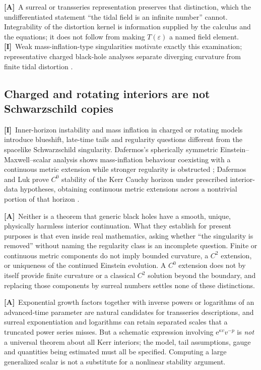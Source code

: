 \documentclass[11pt,letterpaper]{article}
\numberwithin{equation}{section}
\theoremstyle{definition}
\theoremstyle{remark}
\newcommand{\eps}{\varepsilon}
\newcommand{\ee}{\mathrm e}
\newcommand{\TA}{\textcolor{TierA}{\textsf{\bfseries[A]}}}
\newcommand{\TI}{\textcolor{TierI}{\textsf{\bfseries[I]}}}
\begin{document}
\TA\ A surreal or transseries representation preserves that distinction, which
the undifferentiated statement ``the tidal field is an infinite number''
cannot. Integrability of the distortion kernel is information supplied by the
calculus and the equations; it does not follow from making $T(\eps)$ a named
field element. \TI\ Weak mass-inflation-type singularities motivate exactly
this examination; representative charged black-hole analyses separate
diverging curvature from finite tidal distortion
\cite{phys:Bhattacharjee}.

\subsection{Charged and rotating interiors are not Schwarzschild copies}
\label{phys:sub:kerr}

\TI\ Inner-horizon instability and mass inflation in charged or rotating
models introduce blueshift, late-time tails and regularity questions different
from the spacelike Schwarzschild singularity. Dafermos's spherically symmetric
Einstein--Maxwell--scalar analysis shows mass-inflation behaviour coexisting
with a continuous metric extension while stronger regularity is obstructed
\cite{phys:Dafermos}; Dafermos and Luk prove $C^{0}$ stability of the Kerr
Cauchy horizon under prescribed interior-data hypotheses, obtaining continuous
metric extensions across a nontrivial portion of that horizon
\cite{phys:DafermosLuk}.

\TA\ Neither is a theorem that generic black holes have a smooth, unique,
physically harmless interior continuation. What they establish for present
purposes is that even inside real mathematics, asking whether ``the singularity
is removed'' without naming the regularity class is an incomplete question.
Finite or continuous metric components do not imply bounded curvature, a
$C^{2}$ extension, or uniqueness of the continued Einstein evolution. A $C^{0}$
extension does not by itself provide finite curvature or a classical $C^{2}$
solution beyond the boundary, and replacing those components by surreal numbers
settles none of these distinctions.

\TA\ Exponential growth factors together with inverse powers or logarithms of
an advanced-time parameter are natural candidates for transseries descriptions,
and surreal exponentiation and logarithms can retain separated scales that a
truncated power series misses. But a schematic expression involving
$\ee^{\kappa v}v^{-p}$ is \emph{not} a universal theorem about all Kerr
interiors; the model, tail assumptions, gauge and quantities being estimated
must all be specified. Computing a large generalized scalar is not a substitute
for a nonlinear stability argument.
\end{document}
